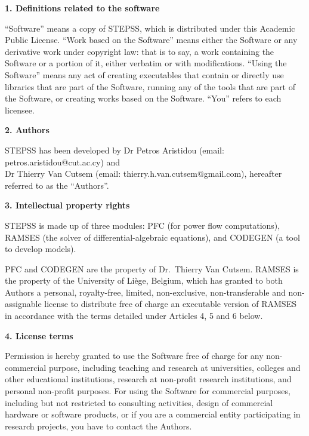 \vspace*{5ex}
\begin{center}
\end{center}

{\bf \large 1. Definitions related to the software}

``Software'' means a copy of STEPSS, which is distributed under this Academic Public License. ``Work based on the Software'' means either the Software or any derivative work under copyright law: that is to say, a work containing the Software or a portion of it, either verbatim or with modifications. ``Using the Software'' means any act of creating executables that contain or directly use libraries that are part of the Software, running any of the tools that are part of the Software, or creating works based on the Software. ``You'' refers to each licensee.

{\bf \large 2. Authors}

STEPSS has been developed by Dr Petros Aristidou (email: petros.aristidou@cut.ac.cy) and\\
Dr Thierry Van Cutsem (email: thierry.h.van.cutsem@gmail.com), hereafter referred to as the ``Authors''.

{\bf \large 3. Intellectual property rights}

STEPSS is made up of three modules: PFC (for power flow computations), RAMSES (the solver of differential-algebraic equations), and CODEGEN (a tool to develop models).

PFC and CODEGEN are the property of Dr.\ Thierry Van Cutsem. RAMSES is the property of the University of Li\`ege, Belgium, which has granted to both Authors a personal, royalty-free, limited, non-exclusive, non-transferable and non-assignable license to distribute free of charge an executable version of RAMSES in accordance with the terms detailed under Articles 4, 5 and 6 below.

{\bf \large 4. License terms}

Permission is hereby granted to use the Software free of charge for any non-commercial purpose, including teaching and research at universities, colleges and other educational institutions, research at non-profit research institutions, and personal non-profit purposes. For using the Software for commercial purposes, including but not restricted to consulting activities, design of commercial hardware or software products, or if you are a commercial entity participating in research projects, you have to contact the Authors.

